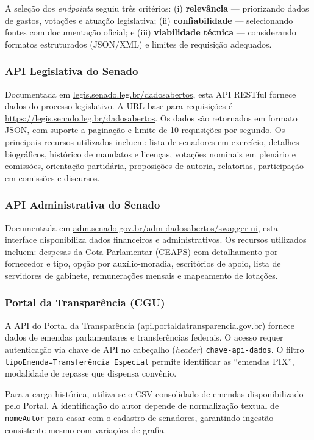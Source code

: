 A seleção dos \textit{endpoints} seguiu três critérios: (i) \textbf{relevância} --- priorizando dados de gastos, votações e atuação legislativa; (ii) \textbf{confiabilidade} --- selecionando fontes com documentação oficial; e (iii) \textbf{viabilidade técnica} --- considerando formatos estruturados (JSON/XML) e limites de requisição adequados.

\subsubsection{API Legislativa do Senado}

Documentada em \url{legis.senado.leg.br/dadosabertos}, esta API RESTful fornece dados do processo legislativo. A URL base para requisições é \url{https://legis.senado.leg.br/dadosabertos}. Os dados são retornados em formato JSON, com suporte a paginação e limite de 10 requisições por segundo. Os principais recursos utilizados incluem: lista de senadores em exercício, detalhes biográficos, histórico de mandatos e licenças, votações nominais em plenário e comissões, orientação partidária, proposições de autoria, relatorias, participação em comissões e discursos.

\subsubsection{API Administrativa do Senado}

Documentada em \url{adm.senado.gov.br/adm-dadosabertos/swagger-ui}, esta interface disponibiliza dados financeiros e administrativos. Os recursos utilizados incluem: despesas da Cota Parlamentar (CEAPS) com detalhamento por fornecedor e tipo, opção por auxílio-moradia, escritórios de apoio, lista de servidores de gabinete, remunerações mensais e mapeamento de lotações.

\subsubsection{Portal da Transparência (CGU)}

A API do Portal da Transparência (\url{api.portaldatransparencia.gov.br}) fornece dados de emendas parlamentares e transferências federais. O acesso requer autenticação via chave de API no cabeçalho (\textit{header}) \texttt{chave-api-dados}. O filtro \texttt{tipoEmenda=Transferência Especial} permite identificar as ``emendas PIX'', modalidade de repasse que dispensa convênio.

Para a carga histórica, utiliza-se o CSV consolidado de emendas disponibilizado pelo Portal. A identificação do autor depende de normalização textual de \texttt{nomeAutor} para casar com o cadastro de senadores, garantindo ingestão consistente mesmo com variações de grafia.


